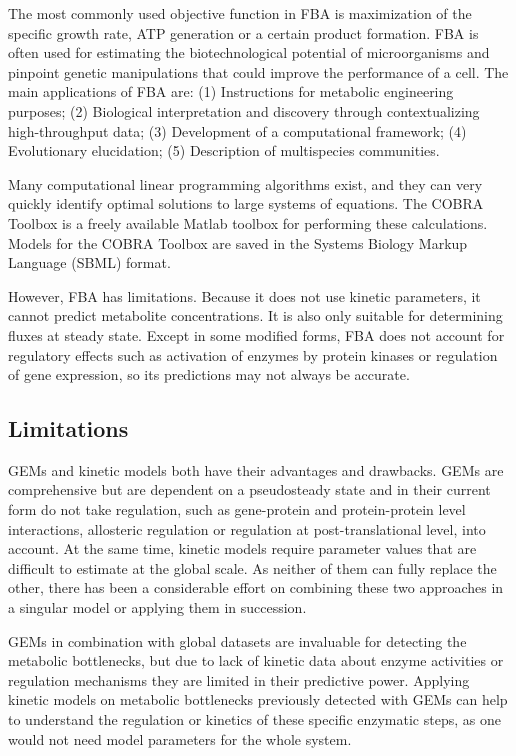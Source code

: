 The most commonly used objective function in FBA is maximization of the 
specific growth rate, ATP generation or a certain product formation. FBA is often used for estimating the biotechnological potential of 
microorganisms and pinpoint genetic manipulations that could improve the performance of a cell. The main applications of 
FBA are:
(1) Instructions for metabolic engineering purposes;
(2) Biological interpretation and discovery through
contextualizing high-throughput data;
(3) Development of a computational framework;
(4) Evolutionary elucidation;
(5) Description of multispecies communities. \cite{Kerkhoven2014}

Many computational linear programming algorithms exist, and they can very quickly 
identify optimal solutions to large systems of equations. The COBRA Toolbox \cite{Becker2007} is a freely available Matlab 
toolbox for performing these calculations. Models for the COBRA Toolbox are saved in the Systems Biology Markup Language (SBML) \cite{Hucka2003} format.

However, FBA has limitations. Because it does not use kinetic parameters, it cannot 
predict metabolite concentrations. It is also only suitable for determining fluxes 
at steady state. Except in some modified forms, FBA does not account for regulatory effects 
such as activation of enzymes by protein kinases or regulation of gene expression, so its predictions 
may not always be accurate. \cite{Orth2010}

\subsection{Limitations}

GEMs and kinetic models both have their advantages
and drawbacks. GEMs are comprehensive but are dependent on a pseudosteady state and in their current form
do not take regulation, such as gene-protein and protein-protein level interactions, allosteric regulation or 
regulation at post-translational level, into account. At the same time, kinetic models require parameter values that are
difficult to estimate at the global scale. As neither of them can fully replace the other, there has been a considerable
effort on combining these two approaches in a singular model or applying them in succession. \cite{Kerkhoven2014}

GEMs in combination with global datasets are invaluable for detecting
the metabolic bottlenecks, but due to lack of kinetic data about enzyme activities or regulation mechanisms they
are limited in their predictive power. Applying kinetic models on metabolic bottlenecks previously detected with
GEMs can help to understand the regulation or kinetics of these specific enzymatic steps, as one would not need
model parameters for the whole system. \cite{Kerkhoven2014}


